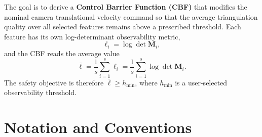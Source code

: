 \documentclass[11pt,a4paper]{article}
\begin{document}
The goal is to derive a \textbf{Control Barrier Function (CBF)} that modifies
the nominal camera translational velocity command so that the average
triangulation quality over all selected features remains above a prescribed
threshold.  Each feature has its own log-determinant observability metric,
\begin{equation}
  \ell_i = \log\det\bm{M}_i,
\end{equation}
and the CBF reads the average value
\begin{equation}
  \bar{\ell}
  = \frac{1}{s}\sum_{i=1}^{s}\ell_i
  = \frac{1}{s}\sum_{i=1}^{s}\log\det\bm{M}_i.
  \label{eq:average_logdet_intro}
\end{equation}
The safety objective is therefore $\bar{\ell}\ge h_{\min}$, where $h_{\min}$
is a user-selected observability threshold.

\section{Notation and Conventions}
\end{document}
